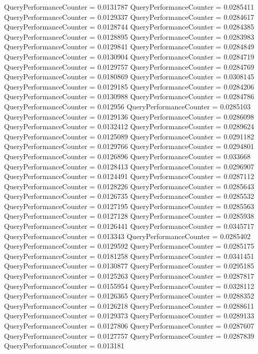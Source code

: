 \documentclass[9pt]{article}
\theoremstyle{plain}
\theoremstyle{definition}
\theoremstyle{remark}
\numberwithin{equation}{section}
\begin{document}
QueryPerformanceCounter  =  0.0131787
QueryPerformanceCounter  =  0.0285411
QueryPerformanceCounter  =  0.0129337
QueryPerformanceCounter  =  0.0284617
QueryPerformanceCounter  =  0.0128744
QueryPerformanceCounter  =  0.0284385
QueryPerformanceCounter  =  0.0128895
QueryPerformanceCounter  =  0.0283983
QueryPerformanceCounter  =  0.0129841
QueryPerformanceCounter  =  0.0284849
QueryPerformanceCounter  =  0.0130904
QueryPerformanceCounter  =  0.0284719
QueryPerformanceCounter  =  0.0129757
QueryPerformanceCounter  =  0.0284769
QueryPerformanceCounter  =  0.0180869
QueryPerformanceCounter  =  0.0308145
QueryPerformanceCounter  =  0.0129185
QueryPerformanceCounter  =  0.0284206
QueryPerformanceCounter  =  0.0130988
QueryPerformanceCounter  =  0.0284786
QueryPerformanceCounter  =  0.012956
QueryPerformanceCounter  =  0.0285103
QueryPerformanceCounter  =  0.0129136
QueryPerformanceCounter  =  0.0286098
QueryPerformanceCounter  =  0.0132412
QueryPerformanceCounter  =  0.0289624
QueryPerformanceCounter  =  0.0125089
QueryPerformanceCounter  =  0.0291182
QueryPerformanceCounter  =  0.0129766
QueryPerformanceCounter  =  0.0294801
QueryPerformanceCounter  =  0.0126896
QueryPerformanceCounter  =  0.033668
QueryPerformanceCounter  =  0.0128413
QueryPerformanceCounter  =  0.0296907
QueryPerformanceCounter  =  0.0124491
QueryPerformanceCounter  =  0.0287112
QueryPerformanceCounter  =  0.0128226
QueryPerformanceCounter  =  0.0285643
QueryPerformanceCounter  =  0.0126735
QueryPerformanceCounter  =  0.0285532
QueryPerformanceCounter  =  0.0127195
QueryPerformanceCounter  =  0.0285563
QueryPerformanceCounter  =  0.0127128
QueryPerformanceCounter  =  0.0285938
QueryPerformanceCounter  =  0.0126441
QueryPerformanceCounter  =  0.0345717
QueryPerformanceCounter  =  0.013343
QueryPerformanceCounter  =  0.0285402
QueryPerformanceCounter  =  0.0129592
QueryPerformanceCounter  =  0.0285175
QueryPerformanceCounter  =  0.0181258
QueryPerformanceCounter  =  0.0341451
QueryPerformanceCounter  =  0.0130877
QueryPerformanceCounter  =  0.0295185
QueryPerformanceCounter  =  0.0125263
QueryPerformanceCounter  =  0.0287817
QueryPerformanceCounter  =  0.0155954
QueryPerformanceCounter  =  0.0328112
QueryPerformanceCounter  =  0.0126365
QueryPerformanceCounter  =  0.0288352
QueryPerformanceCounter  =  0.0126218
QueryPerformanceCounter  =  0.0288611
QueryPerformanceCounter  =  0.0129373
QueryPerformanceCounter  =  0.0289133
QueryPerformanceCounter  =  0.0127806
QueryPerformanceCounter  =  0.0287607
QueryPerformanceCounter  =  0.0127757
QueryPerformanceCounter  =  0.0287839
QueryPerformanceCounter  =  0.013181
\end{document}
